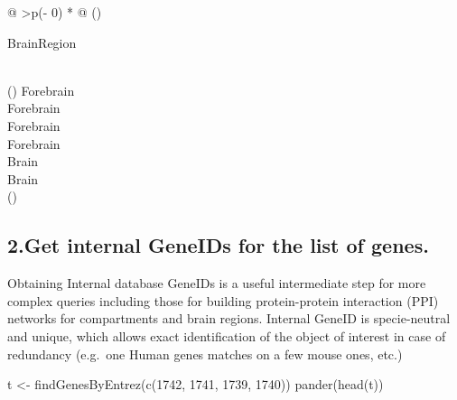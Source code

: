 \documentclass[
]{article}
\newenvironment{Shaded}{\begin{snugshade}}{\end{snugshade}}
\newcommand{\DecValTok}[1]{\textcolor[rgb]{0.00,0.00,0.81}{#1}}
\newcommand{\FunctionTok}[1]{\textcolor[rgb]{0.00,0.00,0.00}{#1}}
\newcommand{\NormalTok}[1]{#1}
\newcommand{\OtherTok}[1]{\textcolor[rgb]{0.56,0.35,0.01}{#1}}
\begin{document}
\begin{longtable}[]{@{}
  >{\centering\arraybackslash}p{(\columnwidth - 0\tabcolsep) * }@{}}
\toprule()
\begin{minipage}[b]{\linewidth}\centering
BrainRegion
\end{minipage} \\
\midrule()
\endhead
Forebrain \\
Forebrain \\
Forebrain \\
Forebrain \\
Brain \\
Brain \\
\bottomrule()
\end{longtable}

\hypertarget{get-internal-geneids-for-the-list-of-genes.}{%
\subsection{2.Get internal GeneIDs for the list of
genes.}\label{get-internal-geneids-for-the-list-of-genes.}}

Obtaining Internal database GeneIDs is a useful intermediate step for
more complex queries including those for building protein-protein
interaction (PPI) networks for compartments and brain regions. Internal
GeneID is specie-neutral and unique, which allows exact identification
of the object of interest in case of redundancy (e.g.~one Human genes
matches on a few mouse ones, etc.)

\begin{Shaded}
\begin{Highlighting}[]
\NormalTok{t }\OtherTok{\textless{}{-}} \FunctionTok{findGenesByEntrez}\NormalTok{(}\FunctionTok{c}\NormalTok{(}\DecValTok{1742}\NormalTok{, }\DecValTok{1741}\NormalTok{, }\DecValTok{1739}\NormalTok{, }\DecValTok{1740}\NormalTok{))}
\FunctionTok{pander}\NormalTok{(}\FunctionTok{head}\NormalTok{(t))}
\end{Highlighting}
\end{Shaded}
\end{document}
